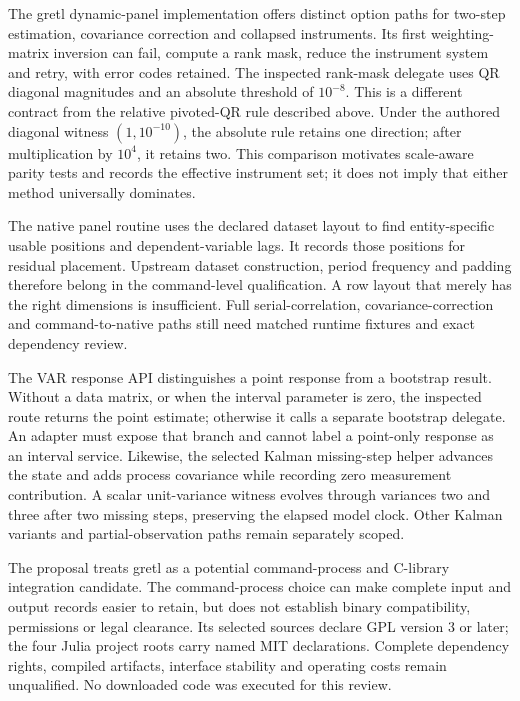 The gretl dynamic-panel implementation offers distinct option paths for two-step estimation, covariance correction and collapsed instruments. Its first weighting-matrix inversion can fail, compute a rank mask, reduce the instrument system and retry, with error codes retained. The inspected rank-mask delegate uses QR diagonal magnitudes and an absolute threshold of $10^{-8}$. This is a different contract from the relative pivoted-QR rule described above. Under the authored diagonal witness $(1,10^{-10})$, the absolute rule retains one direction; after multiplication by $10^4$, it retains two. This comparison motivates scale-aware parity tests and records the effective instrument set; it does not imply that either method universally dominates.~\citep{exec25_odyn_gretl,exec25_odyn_choice}

The native panel routine uses the declared dataset layout to find entity-specific usable positions and dependent-variable lags. It records those positions for residual placement. Upstream dataset construction, period frequency and padding therefore belong in the command-level qualification. A row layout that merely has the right dimensions is insufficient. Full serial-correlation, covariance-correction and command-to-native paths still need matched runtime fixtures and exact dependency review.

The VAR response API distinguishes a point response from a bootstrap result. Without a data matrix, or when the interval parameter is zero, the inspected route returns the point estimate; otherwise it calls a separate bootstrap delegate. An adapter must expose that branch and cannot label a point-only response as an interval service. Likewise, the selected Kalman missing-step helper advances the state and adds process covariance while recording zero measurement contribution. A scalar unit-variance witness evolves through variances two and three after two missing steps, preserving the elapsed model clock. Other Kalman variants and partial-observation paths remain separately scoped.~\citep{exec25_odyn_gretl,exec25_odyn_choice}

The proposal treats gretl as a potential command-process and C-library integration candidate. The command-process choice can make complete input and output records easier to retain, but does not establish binary compatibility, permissions or legal clearance. Its selected sources declare GPL version 3 or later; the four Julia project roots carry named MIT declarations. Complete dependency rights, compiled artifacts, interface stability and operating costs remain unqualified. No downloaded code was executed for this review.~\citep{exec25_odyn_gretl,exec25_odyn_dpm,exec25_odyn_lp,exec25_odyn_macro,exec25_odyn_ssm}


